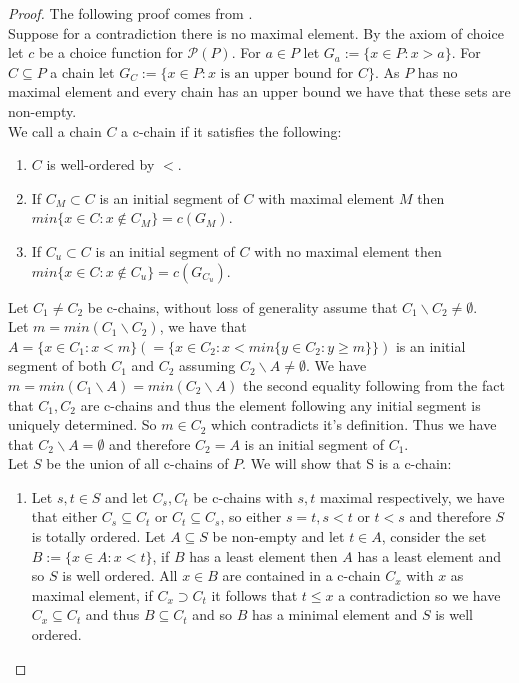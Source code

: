 \documentclass{report}
\begin{document}
\begin{proof}
The following proof comes from \cite{good zorn}.\\
Suppose for a contradiction there is no maximal element. By the axiom of choice let \(c\) be a choice function for \(\mathcal{P}(P)\). For \(a \in P\) let \(G_a:=\{x \in P:x> a\}\). For \(C \subseteq P\) a chain let \(G_C:=\{x \in P: x\text{ is an upper bound for }C\}\). As \(P\) has no maximal element and every chain has an upper bound we have that these sets are non-empty.\\
We call a chain \(C\) a c-chain if it satisfies the following:
\begin{enumerate}
\item \(C\) is well-ordered by \(<\).
\item If \(C_M\subset C\) is an initial segment of \(C\) with maximal element \(M\) then \(min\{x \in C:x \notin C_{M}\} = c(G_M)\).
\item If \(C_u\subset C\) is an initial segment of \(C\) with no maximal element then \(min\{x \in C:x \notin C_{u}\} = c(G_{C_u})\).
\end{enumerate}
Let \(C_1 \neq C_2\) be c-chains, without loss of generality assume that \(C_1 \backslash C_2 \neq \emptyset\).\\
Let \(m = min(C_1 \backslash C_2)\), we have that \(A = \{x \in C_1:x<m\}(= \{x \in C_2:x<min\{y \in C_2:y\geq m\}\})\) is an initial segment of both \(C_1\) and \(C_2\) assuming \(C_2 \backslash A \neq \emptyset\). We have \(m=min(C_1 \backslash A)=min(C_2 \backslash A)\) the second equality following from the fact that \(C_1,C_2\) are c-chains and thus the element following any initial segment is uniquely determined. So \(m \in C_2\) which contradicts it's definition. Thus we have that \(C_2 \backslash A = \emptyset\) and therefore \(C_2 = A\) is an initial segment of \(C_1\).\\
Let \(S\) be the union of all c-chains of \(P\). We will show that S is a c-chain:
\begin{enumerate}
\item  Let \(s,t \in S\) and let \(C_s,C_t\) be c-chains with \(s,t\) maximal respectively, we have that either \(C_s \subseteq C_t\) or \(C_t \subseteq C_s\), so either \(s=t,s<t\) or \(t<s\) and therefore \(S\) is totally ordered. Let \(A \subseteq S\) be non-empty and let \(t \in A\), consider the set \(B:=\{x \in A: x < t\}\), if \(B\) has a least element then \(A\) has a least element and so \(S\) is well ordered. All \(x \in B\) are contained in a c-chain \(C_x\) with \(x\) as maximal element, if \(C_x \supset C_t\) it follows that \(t \leq x\) a contradiction so we have \(C_x \subseteq C_t\) and thus \(B \subseteq C_t\) and so \(B\) has a minimal element and \(S\) is well ordered.

\end{enumerate}
\end{proof}
\end{document}
